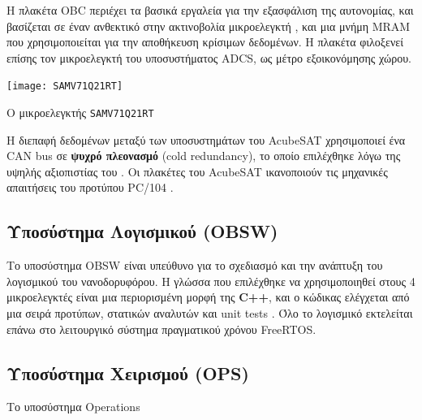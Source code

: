 \documentclass[a4paper,nobib]{tufte-book}
\begin{document}
Η πλακέτα \ac{OBC} περιέχει τα βασικά εργαλεία για την εξασφάλιση της αυτονομίας, και βασίζεται σε έναν ανθεκτικό στην ακτινοβολία μικροελεγκτή , και μια μνήμη \acs{MRAM} που χρησιμοποιείται για την αποθήκευση κρίσιμων δεδομένων. Η πλακέτα φιλοξενεί επίσης τον μικροελεγκτή του υποσυστήματος \ac{ADCS}, ως μέτρο εξοικονόμησης χώρου.

\begin{marginfigure}
	\centering
	\texttt{[image: SAMV71Q21RT]}
	\caption{Ο μικροελεγκτής \texttt{SAMV71Q21RT}}
	\label{fig:samv71}
\end{marginfigure}

Η διεπαφή δεδομένων μεταξύ των υποσυστημάτων του AcubeSAT χρησιμοποιεί ένα \ac{CAN} bus σε \textbf{ψυχρό πλεονασμό} (cold redundancy), το οποίο επιλέχθηκε λόγω της υψηλής αξιοπιστίας του \autocite{bouwmeester_survey_implementation_2017}. Οι πλακέτες του AcubeSAT ικανοποιούν τις μηχανικές απαιτήσεις του προτύπου PC/104 \autocite{PC104}.

\subsection{Υποσύστημα Λογισμικού (\acs{OBSW})}


Το υποσύστημα \ac{OBSW} είναι υπεύθυνο για το σχεδιασμό και την ανάπτυξη του λογισμικού του νανοδορυφόρου. Η γλώσσα που επιλέχθηκε να χρησιμοποιηθεί στους 4 μικροελεγκτές είναι μια περιορισμένη μορφή της \textbf{C++}, και ο κώδικας ελέγχεται από μια σειρά προτύπων, στατικών αναλυτών και unit tests \autocite{DDJF_OBSW}. Όλο το λογισμικό εκτελείται επάνω στο λειτουργικό σύστημα πραγματικού χρόνου Free\acs{RTOS}.


\subsection{Υποσύστημα Χειρισμού (\acs{OPS})}

Το υποσύστημα Operations 
\end{document}
